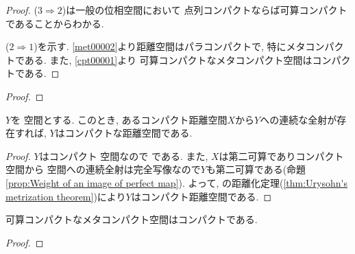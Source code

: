 \documentclass[uplatex, dvipdfmx, a4paper, 12pt, class=jsbook, crop=false]{standalone}
\begin{document}
\begin{proof}
	(\(3 \Longrightarrow 2\))は一般の位相空間において
	点列コンパクトならば可算コンパクトであることからわかる.

	(\(2 \Longrightarrow 1\))を示す.
	\cref{met00002}より距離空間はパラコンパクトで,
	特にメタコンパクトである.
	また, \cref{cpt00001}より
	可算コンパクトなメタコンパクト空間はコンパクトである.
\end{proof}

\begin{proof}
	\WIP
\end{proof}

\begin{proposition}
	$ Y $を \Hausdorff 空間とする.
	このとき, あるコンパクト距離空間$ X $から$ Y $への連続な全射が存在すれば, $ Y $はコンパクトな距離空間である.
\end{proposition}

\begin{proof}
	$ Y $はコンパクト \Hausdorff 空間なので  である.
	また, $ X $は第二可算でありコンパクト空間から \Hausdorff 空間への連続全射は完全写像なので$ Y $も第二可算である(命題 \ref{prop:Weight of an image of perfect map}).
	よって, \Urysohn の距離化定理(\ref{thm:Urysohn's metrization theorem})により$ Y $はコンパクト距離空間である.
\end{proof}

\begin{theorem}
	可算コンパクトなメタコンパクト空間はコンパクトである.
\end{theorem}

\begin{proof}
	\WIP
\end{proof}
\end{document}
